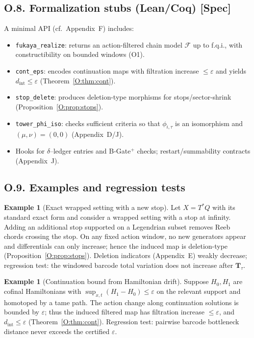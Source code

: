 \documentclass[11pt]{article}
\numberwithin{equation}{section}
\theoremstyle{plain}
\theoremstyle{definition}
\theoremstyle{remark}
\theoremstyle{plain}
\theoremstyle{definition}
\numberwithin{equation}{section}
\theoremstyle{definition}
\newtheorem{example}[theorem]{Example}
\numberwithin{equation}{section}
\theoremstyle{plain}
\theoremstyle{definition}
\theoremstyle{remark}
\begin{document}
\subsection*{O.8. Formalization stubs (Lean/Coq) [Spec]}
A minimal API (cf.\ Appendix~F) includes:
\begin{itemize}\itemsep0.25em
  \item \texttt{fukaya\_realize}: returns an action-filtered chain model \(\mathcal{F}\) up to f.q.i., with constructibility on bounded windows (O1).
  \item \texttt{cont\_eps}: encodes continuation maps with filtration increase \(\le\varepsilon\) and yields \(d_{\mathrm{int}}\le\varepsilon\) (Theorem~\ref{O:thm:cont}).
  \item \texttt{stop\_delete}: produces deletion-type morphisms for stops/sector-shrink (Proposition~\ref{O:prop:stops}).
  \item \texttt{tower\_phi\_iso}: checks sufficient criteria so that \(\phi_{i,\tau}\) is an isomorphism and \((\mu,\nu)=(0,0)\) (Appendix~D/J).
  \item Hooks for \(\delta\)–ledger entries and B-Gate\(^{+}\) checks; restart/summability contracts (Appendix~J).
\end{itemize}

\subsection*{O.9. Examples and regression tests}
\begin{example}[Exact wrapped setting with a new stop]
Let \(X=T^*Q\) with its standard exact form and consider a wrapped setting with a stop at infinity. Adding an additional stop supported on a Legendrian subset removes Reeb chords crossing the stop. On any fixed action window, no new generators appear and differentials can only increase; hence the induced map is deletion-type (Proposition~\ref{O:prop:stops}). Deletion indicators (Appendix~E) weakly decrease; regression test: the windowed barcode total variation does not increase after \(\mathbf{T}_\tau\).
\end{example}

\begin{example}[Continuation bound from Hamiltonian drift]
Suppose \(H_0,H_1\) are cofinal Hamiltonians with \(\sup_{x,t}(H_1-H_0)\le \varepsilon\) on the relevant support and homotoped by a tame path. The action change along continuation solutions is bounded by \(\varepsilon\); thus the induced filtered map has filtration increase \(\le \varepsilon\), and \(d_{\mathrm{int}}\le \varepsilon\) (Theorem~\ref{O:thm:cont}). Regression test: pairwise barcode bottleneck distance never exceeds the certified \(\varepsilon\).
\end{example}
\end{document}
